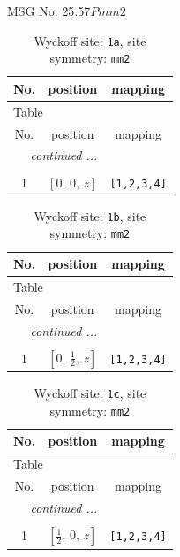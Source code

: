 \documentclass[fleqn,8pt]{jsarticle}
\begin{document}
\setcounter{MaxMatrixCols}{32}

\renewcommand{\tablename}{Table~}
\renewcommand{\figurename}{Figure~}
\begin{center}
\LARGE
MSG No. 25.57\quad$Pmm2$
\end{center}
\renewcommand{\arraystretch}{1.2}
\begin{longtable}{ccc}
\caption{Wyckoff site: {\tt 1a}, site symmetry: {\tt mm2}}
 \\
 \hline \hline
No. & position & mapping \\ \hline \endfirsthead

\multicolumn{2}{l}{\tablename\ \thetable{}} \\
 \hline \hline
No. & position & mapping \\ \hline \endhead

 \hline \hline
\multicolumn{2}{r}{\footnotesize\it continued ...} \\ \endfoot

 \hline \hline
\multicolumn{2}{r}{} \\ \endlastfoot

1 & $\left[ 0,\, 0,\, z \right]$ & {\tt [1,2,3,4]} \\
\end{longtable}
\renewcommand{\arraystretch}{1.2}
\begin{longtable}{ccc}
\caption{Wyckoff site: {\tt 1b}, site symmetry: {\tt mm2}}
 \\
 \hline \hline
No. & position & mapping \\ \hline \endfirsthead

\multicolumn{2}{l}{\tablename\ \thetable{}} \\
 \hline \hline
No. & position & mapping \\ \hline \endhead

 \hline \hline
\multicolumn{2}{r}{\footnotesize\it continued ...} \\ \endfoot

 \hline \hline
\multicolumn{2}{r}{} \\ \endlastfoot

1 & $\left[ 0,\, \frac{1}{2},\, z \right]$ & {\tt [1,2,3,4]} \\
\end{longtable}
\renewcommand{\arraystretch}{1.2}
\begin{longtable}{ccc}
\caption{Wyckoff site: {\tt 1c}, site symmetry: {\tt mm2}}
 \\
 \hline \hline
No. & position & mapping \\ \hline \endfirsthead

\multicolumn{2}{l}{\tablename\ \thetable{}} \\
 \hline \hline
No. & position & mapping \\ \hline \endhead

 \hline \hline
\multicolumn{2}{r}{\footnotesize\it continued ...} \\ \endfoot

 \hline \hline
\multicolumn{2}{r}{} \\ \endlastfoot

1 & $\left[ \frac{1}{2},\, 0,\, z \right]$ & {\tt [1,2,3,4]} \\
\end{longtable}
\end{document}
